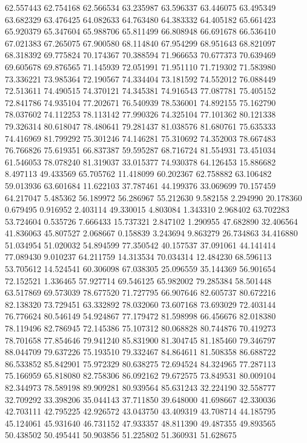62.557443
62.754168
62.566534
63.235987
63.596337
63.446075
63.495349
63.682329
63.476425
64.082633
64.763480
64.383332
64.405182
65.661423
65.920379
65.347604
65.988706
65.811499
66.808948
66.691678
66.536410
67.021383
67.265075
67.900580
68.114840
67.954299
68.951643
68.821097
68.318392
69.775824
70.174367
70.388594
71.966653
70.677373
70.639469
69.605678
69.876565
71.145939
72.051991
71.951110
71.719302
71.583980
73.336221
73.985364
72.190567
74.334404
73.181592
74.552012
76.088449
72.513611
74.490515
74.370121
74.345381
74.916543
77.087781
75.405152
72.841786
74.935104
77.202671
76.540939
78.536001
74.892155
75.162790
78.037602
74.112253
78.113142
77.990326
74.325104
77.101362
80.121338
79.326314
80.618047
78.480641
79.281437
81.038576
81.680761
75.635333
74.416969
81.799292
75.301246
74.146281
75.310692
74.352003
78.667483
76.766826
75.619351
66.837387
59.595287
68.716724
81.554931
73.451034
61.546053
78.078240
81.319037
33.015377
74.930378
64.126453
15.886682
8.497113
49.433569
65.705762
11.418099
60.202367
62.758882
63.106482
59.013936
63.601684
11.622103
37.787461
44.199376
33.069699
70.157459
64.217047
5.485362
56.189972
56.286967
55.212630
9.582158
2.294990
20.178360
0.679495
0.916952
2.403114
49.330015
4.803084
1.343310
2.968402
63.702283
53.724604
0.535726
7.666433
15.737321
2.847102
1.290955
47.682890
32.406564
41.836063
45.807527
2.068667
0.158839
3.243694
9.863279
26.734863
34.416880
51.034954
51.020032
54.894599
77.350542
40.157537
37.091061
44.141414
77.089430
9.010237
64.211759
14.313534
70.034314
12.484230
68.596113
53.705612
14.524541
60.306098
67.038305
25.096559
35.144369
56.901654
72.152521
1.336465
57.927714
69.546125
65.982002
79.285384
58.501448
63.517869
69.573039
78.677520
71.727795
66.907646
82.605737
80.672216
82.138320
73.729451
63.332892
78.032060
73.607168
73.693029
72.403144
76.776624
80.546149
54.924867
77.179472
81.598998
66.456676
82.018380
78.119496
82.786945
72.145386
75.107312
80.068828
80.744876
70.419273
78.701658
77.854646
79.941240
85.831900
81.304745
81.185460
79.346797
88.044709
79.637226
75.193510
79.332467
84.864611
81.508358
86.688722
86.533852
85.842901
75.972329
80.638275
72.694524
84.324965
77.287113
75.166959
65.818080
82.758306
86.092162
79.672575
73.849531
80.009104
82.344973
78.589198
89.909281
80.939564
85.631243
32.224190
32.558777
32.709292
33.398206
35.044143
37.711850
39.648000
41.698667
42.330036
42.703111
42.795225
42.926572
43.043750
43.409319
43.708714
44.185795
45.124061
45.931640
46.731152
47.933357
48.811390
49.487355
49.893565
50.438502
50.495441
50.903856
51.225802
51.360931
51.628675
